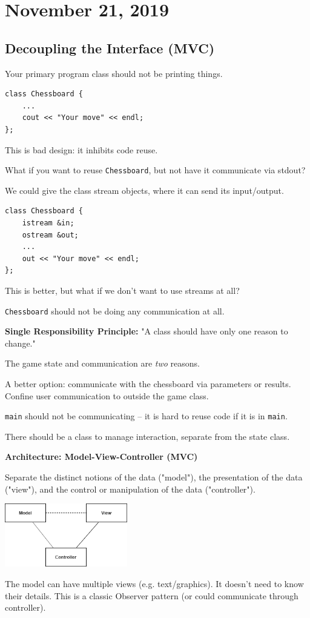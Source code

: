\documentclass[11pt]{article}
\theoremstyle{definition}
\begin{document}
\newpage
\section{November 21, 2019}

\subsection{Decoupling the Interface (MVC)}
Your primary program class should not be printing things.
\begin{lstlisting}
class Chessboard {
    ...
    cout << "Your move" << endl;
};
\end{lstlisting}
\vspace{-0.25cm}
This is bad design: it inhibits code reuse. 

What if you want to reuse {\tt Chessboard}, but not have it communicate via stdout?

We could give the class stream objects, where it can send its input/output.
\begin{lstlisting}
class Chessboard {
    istream &in;
    ostream &out;
    ...
    out << "Your move" << endl;
};
\end{lstlisting}
\vspace{-0.25cm}
This is better, but what if we don't want to use streams at all?

{\tt Chessboard} should not be doing any communication at all.

{\bf Single Responsibility Principle:} "A class should have only one reason to change."

The game state and communication are \emph{two} reasons.

A better option: communicate with the chessboard via parameters or results. Confine user communication to outside the game class.

{\tt main} should not be communicating -- it is hard to reuse code if it is in {\tt main}. 

There should be a class to manage interaction, separate from the state class.

{\bf Architecture: Model-View-Controller (MVC)}

Separate the distinct notions of the data ("model"), the presentation of the data ("view"), and the control or manipulation of the data ("controller").
\begin{center}
\includegraphics[width=0.4\textwidth]{images/mvc.png}
\end{center}
The model can have multiple views (e.g. text/graphics). It doesn't need to know their details. This is a classic Observer pattern (or could communicate through controller).
\end{document}
